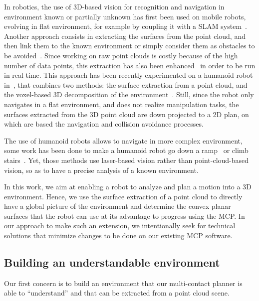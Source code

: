 In robotics, the use of 3D-based vision for recognition and navigation in environment known or partially unknown has first been used on mobile robots, evolving in flat environment, for example by coupling it with a SLAM system~\cite{whitty:acra:2012}.
Another approach consists in extracting the surfaces from the point cloud, and then link them to the known environment or simply consider them as obstacles to be avoided~\cite{poppinga:iros:2008}.
Since working on raw point clouds is costly because of the high number of data points, this extraction has also been enhanced~\cite{biswas:icra:2012} in order to be run in real-time.
This approach has been recently experimented on a humanoid robot in~\cite{maier:humanoids:2012}, that combines two methods: the surface extraction from a point cloud, and the voxel-based 3D decomposition of the environment~\cite{nakhaei:humanoids:2008}.
Still, since the robot only navigates in a flat environment, and does not realize manipulation tasks, the surfaces extracted from the 3D point cloud are down projected to a 2D plan, on which are based the navigation and collision avoidance processes.

The use of humanoid robots allows to navigate in more complex environment, some work has been done to make a humanoid robot go down a ramp~\cite{lutz:iros:2012} or climb stairs~\cite{osswald:iros:2012}.
Yet, those methods use laser-based vision rather than point-cloud-based vision, so as to have a precise analysis of a known environment.

In this work, we aim at enabling a robot to analyze and plan a motion into a 3D environment.
Hence, we use the surface extraction of a point cloud to directly have a global picture of the environment and determine the convex planar surfaces that the robot can use at its advantage to progress using the MCP.\@
In our approach to make such an extension, we intentionally seek for technical solutions that minimize changes to be done on our existing MCP software.

\subsection{Building an understandable environment}
\label{sub:building_an_understandable_environment}

Our first concern is to build an environment that our multi-contact planner is able to ``understand'' and that can be extracted from a point cloud scene.

